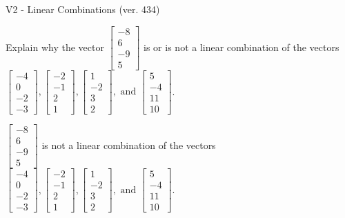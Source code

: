 \begin{exercise}
  \begin{exerciseTitle}V2 - Linear Combinations (ver. 434)\end{exerciseTitle}
  \begin{exerciseStatement}
    Explain why the vector \(\left[\begin{array}{c}
-8 \\
6 \\
-9 \\
5
\end{array}\right]\)  is or is not a linear 
	combination of the vectors \(\left[\begin{array}{c}
-4 \\
0 \\
-2 \\
-3
\end{array}\right] , \left[\begin{array}{c}
-2 \\
-1 \\
2 \\
1
\end{array}\right] , \left[\begin{array}{c}
1 \\
-2 \\
3 \\
2
\end{array}\right] , \text{ and } \left[\begin{array}{c}
5 \\
-4 \\
11 \\
10
\end{array}\right]\).
	


  \end{exerciseStatement}
  \begin{exerciseAnswer}
   \(\left[\begin{array}{c}
-8 \\
6 \\
-9 \\
5
\end{array}\right]\) 
  	 is not  
	a linear combination of the vectors \(\left[\begin{array}{c}
-4 \\
0 \\
-2 \\
-3
\end{array}\right] , \left[\begin{array}{c}
-2 \\
-1 \\
2 \\
1
\end{array}\right] , \left[\begin{array}{c}
1 \\
-2 \\
3 \\
2
\end{array}\right] , \text{ and } \left[\begin{array}{c}
5 \\
-4 \\
11 \\
10
\end{array}\right]\).


\end{exerciseAnswer}
\end{exercise}
